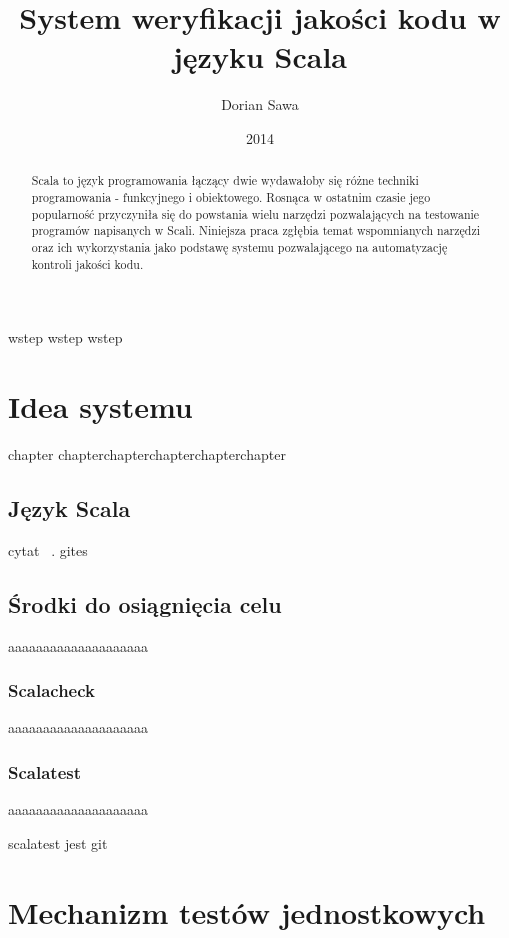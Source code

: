 \documentclass[brudnopis]{xmgr}
\author   {Dorian Sawa}
\title    {System weryfikacji jakości kodu w języku Scala}
\date     {2014}
\begin{document}
\begin{abstract}
 Scala to język programowania łączący dwie wydawałoby się różne techniki programowania - funkcyjnego i obiektowego. 
Rosnąca w ostatnim czasie jego popularność przyczyniła się do powstania wielu narzędzi pozwalających na testowanie 
programów napisanych w Scali. Niniejsza praca zgłębia temat wspomnianych narzędzi oraz ich wykorzystania jako podstawę 
systemu pozwalającego na automatyzację kontroli jakości kodu.
\end{abstract}

\maketitle
%
\introduction

wstep wstep wstep

\chapter{Idea systemu}

chapter chapterchapterchapterchapterchapter 

\section{Język Scala}

cytat ~\cite[s.~123]{Elmasri:2002:CMC}. 
gites
    
\section{Środki do osiągnięcia celu}

aaaaaaaaaaaaaaaaaaaa

\subsection{Scalacheck}

aaaaaaaaaaaaaaaaaaaa

\subsection{Scalatest} 

aaaaaaaaaaaaaaaaaaaa

scalatest jest git
      
\chapter{Mechanizm testów jednostkowych}
\end{document}
